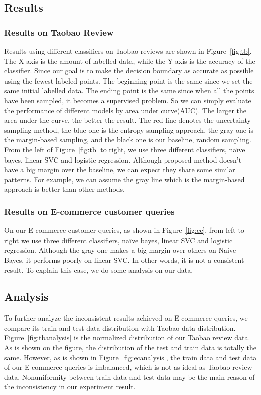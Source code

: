 \documentclass{acmtog}
\begin{document}
\subsection{Results}
\label{subsec:experiments}
\subsubsection{Results on Taobao Review}

Results using different classifiers  on Taobao reviews are shown in Figure~\ref{fig:tb}.  The X-axis is the amount of labelled data, while the Y-axis is the accuracy of the classifier. Since our goal is to make the decision boundary as accurate as possible using the fewest labeled points. The beginning point is the same since we set the same initial labelled data. The ending point is the same since when all the points have been sampled, it becomes a supervised problem. So we can simply evaluate the performance of different models by area under curve(AUC). The larger the area under the curve, the better the result. The red line denotes the uncertainty sampling method, the blue one is the entropy sampling approach, the gray one is the margin-based sampling, and the black one is our baseline, random sampling. From the left of Figure~\ref{fig:tb} to right, we use three different classifiers, naïve bayes, linear SVC and logistic regression. Although proposed method doesn't have a big margin over the baseline, we can expect they share some similar patterns.  For example, we can assume the gray line which is the margin-based approach is better than other methods.
\subsubsection{Results on E-commerce customer queries}



On our E-commerce customer queries, as shown in Figure~\ref{fig:ec}, from left to right we use three different classifiers, naïve bayes, linear SVC and logistic regression. Although the gray one makes a big margin over others on Naive Bayes, it performs poorly on linear SVC. In other words, it is not a consistent result. To explain this case, we do some analysis on our data.


\subsection{Analysis}

To further analyze the inconsistent results achieved on E-commerce queries, we compare its train and test data distribution with Taobao data distribution.
Figure~\ref{fig:tbanalysis} is the normalized distribution of our Taobao review data. As is shown on the figure, the distribution of the test and train data is totally the same.
However, as is shown in Figure~\ref{fig:ecanalysis}, the train data and test data of our E-commerce queries is imbalanced, which is not as ideal as Taobao review data. Nonuniformity between train data and test data may be the main reason of the inconsistency in our experiment result.
 
\end{document}
